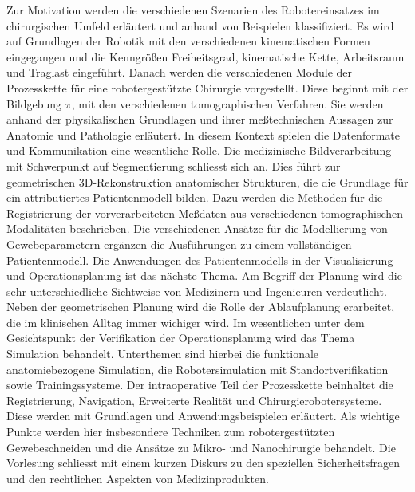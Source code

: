 \begin{module}
\begin{content}
Zur Motivation werden die verschiedenen Szenarien des Robotereinsatzes im chirurgischen Umfeld erläutert und anhand von Beispielen klassifiziert. Es wird auf Grundlagen der Robotik mit den verschiedenen kinematischen Formen eingegangen und die Kenngrößen Freiheitsgrad, kinematische Kette, Arbeitsraum und Traglast eingeführt. Danach werden die verschiedenen Module der Prozesskette für eine robotergestützte Chirurgie vorgestellt. Diese beginnt mit der Bildgebung $\pi{}$, mit den verschiedenen tomographischen Verfahren. Sie werden anhand der physikalischen Grundlagen und ihrer meßtechnischen Aussagen zur Anatomie und Pathologie erläutert. In diesem Kontext spielen die Datenformate und Kommunikation eine wesentliche Rolle. Die medizinische Bildverarbeitung mit Schwerpunkt auf Segmentierung schliesst sich an. Dies führt zur geometrischen 3D-Rekonstruktion anatomischer Strukturen, die die Grundlage für ein attributiertes Patientenmodell bilden. Dazu werden die Methoden für die Registrierung der vorverarbeiteten Meßdaten aus verschiedenen tomographischen Modalitäten beschrieben. Die verschiedenen Ansätze für die Modellierung von Gewebeparametern ergänzen die Ausführungen zu einem vollständigen Patientenmodell. Die Anwendungen des Patientenmodells in der Visualisierung und Operationsplanung ist das nächste Thema. Am Begriff der Planung wird die sehr unterschiedliche Sichtweise von Medizinern und Ingenieuren verdeutlicht. Neben der geometrischen Planung wird die Rolle der Ablaufplanung erarbeitet, die im klinischen Alltag immer wichiger wird. Im wesentlichen unter dem Gesichtspunkt der Verifikation der Operationsplanung wird das Thema Simulation behandelt. Unterthemen sind hierbei die funktionale anatomiebezogene Simulation, die Robotersimulation mit Standortverifikation sowie Trainingssysteme. Der intraoperative Teil der Prozesskette beinhaltet die Registrierung, Navigation, Erweiterte Realität und Chirurgierobotersysteme. Diese werden mit Grundlagen und Anwendungsbeispielen erläutert. Als wichtige Punkte werden hier insbesondere Techniken zum robotergestützten Gewebeschneiden und die Ansätze zu Mikro- und Nanochirurgie behandelt. Die Vorlesung schliesst mit einem kurzen Diskurs zu den speziellen Sicherheitsfragen und den rechtlichen Aspekten von Medizinprodukten.


\end{content}



\end{module}

